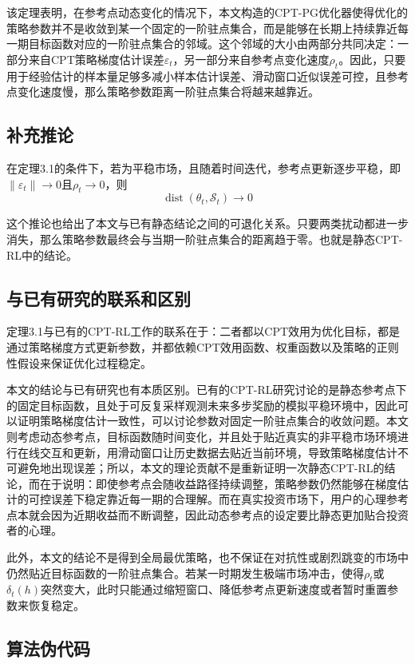 \documentclass{sufethesismas}
\begin{document}
该定理表明，在参考点动态变化的情况下，本文构造的CPT-PG优化器使得优化的策略参数并不是收敛到某一个固定的一阶驻点集合，而是能够在长期上持续靠近每一期目标函数对应的一阶驻点集合的邻域。这个邻域的大小由两部分共同决定：一部分来自CPT策略梯度估计误差$\varepsilon_t$，另一部分来自参考点变化速度$\rho_t$。因此，只要用于经验估计的样本量足够多减小样本估计误差、滑动窗口近似误差可控，且参考点变化速度慢，那么策略参数距离一阶驻点集合将越来越靠近。

\subsection{补充推论}
在定理3.1的条件下，若为平稳市场，且随着时间迭代，参考点更新逐步平稳，即
$\|\varepsilon_t\| \to 0$且$\rho_t \to 0$，则
\begin{equation}
\operatorname{dist}(\theta_t,\mathcal S_t)\to 0
\end{equation}

这个推论也给出了本文与已有静态结论之间的可退化关系。只要两类扰动都进一步消失，那么策略参数最终会与当期一阶驻点集合的距离趋于零。也就是静态CPT-RL中的结论。
\subsection{与已有研究的联系和区别}

定理3.1与已有的CPT-RL工作的联系在于：二者都以CPT效用为优化目标，都是通过策略梯度方式更新参数，并都依赖CPT效用函数、权重函数以及策略的正则性假设来保证优化过程稳定。

本文的结论与已有研究也有本质区别。已有的CPT-RL研究讨论的是静态参考点下的固定目标函数，且处于可反复采样观测未来多步奖励的模拟平稳环境中，因此可以证明策略梯度估计一致性，可以讨论参数对固定一阶驻点集合的收敛问题。本文则考虑动态参考点，目标函数随时间变化，并且处于贴近真实的非平稳市场环境进行在线交互和更新，用滑动窗口让历史数据去贴近当前环境，导致策略梯度估计不可避免地出现误差；所以，本文的理论贡献不是重新证明一次静态CPT-RL的结论，而在于说明：即使参考点会随收益路径持续调整，策略参数仍然能够在梯度估计的可控误差下稳定靠近每一期的合理解。而在真实投资市场下，用户的心理参考点本就会因为近期收益而不断调整，因此动态参考点的设定要比静态更加贴合投资者的心理。

此外，本文的结论不是得到全局最优策略，也不保证在对抗性或剧烈跳变的市场中仍然贴近目标函数的一阶驻点集合。若某一时期发生极端市场冲击，使得$\rho_t$或$\delta_t(h)$突然变大，此时只能通过缩短窗口、降低参考点更新速度或者暂时重置参数来恢复稳定。

\subsection{算法伪代码}
\end{document}
